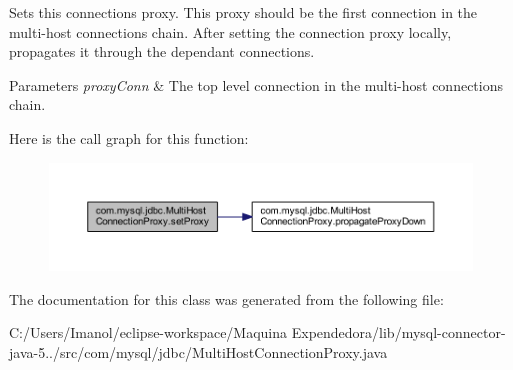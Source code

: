 Sets this connection\textquotesingle{}s proxy. This proxy should be the first connection in the multi-\/host connections chain. After setting the connection proxy locally, propagates it through the dependant connections.


\begin{DoxyParams}{Parameters}
{\em proxy\+Conn} & The top level connection in the multi-\/host connections chain. \\
\hline
\end{DoxyParams}
Here is the call graph for this function\+:
\nopagebreak
\begin{figure}[H]
\begin{center}
\leavevmode
\includegraphics[width=350pt]{classcom_1_1mysql_1_1jdbc_1_1_multi_host_connection_proxy_aac045496f382b249b0fbbdf5d1163813_cgraph}
\end{center}
\end{figure}


The documentation for this class was generated from the following file\+:\begin{DoxyCompactItemize}
\item 
C\+:/\+Users/\+Imanol/eclipse-\/workspace/\+Maquina Expendedora/lib/mysql-\/connector-\/java-\/5../src/com/mysql/jdbc/Multi\+Host\+Connection\+Proxy.\+java\end{DoxyCompactItemize}
